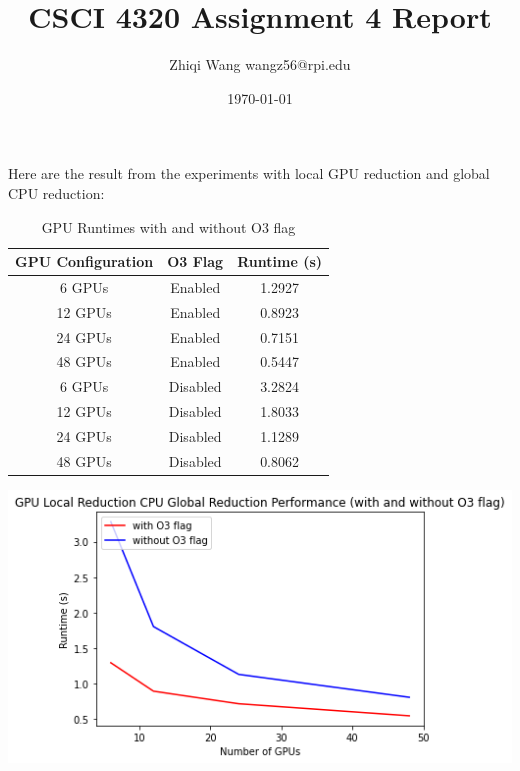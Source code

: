 \documentclass{article}
\begin{document}
\title{\vspace{-3cm}CSCI 4320 Assignment 4 Report}
\author{Zhiqi Wang wangz56@rpi.edu}
\date{\today}
\maketitle

Here are the result from the experiments with local GPU reduction and global CPU reduction:

\begin{table}[h!]
  \centering
  \begin{tabular}{|c|c|c|}
  \hline
  \textbf{GPU Configuration} & \textbf{O3 Flag} & \textbf{Runtime (s)} \\ \hline
  6 GPUs & Enabled & 1.2927 \\ \hline
  12 GPUs & Enabled & 0.8923 \\ \hline
  24 GPUs & Enabled & 0.7151 \\ \hline
  48 GPUs & Enabled & 0.5447 \\ \hline
  6 GPUs & Disabled & 3.2824 \\ \hline
  12 GPUs & Disabled & 1.8033 \\ \hline
  24 GPUs & Disabled & 1.1289 \\ \hline
  48 GPUs & Disabled & 0.8062 \\ \hline
  \end{tabular}
  \caption{GPU Runtimes with and without O3 flag}
  \end{table}
  
  \includegraphics[width=\textwidth]{gpu_local.png}
  
\end{document}
